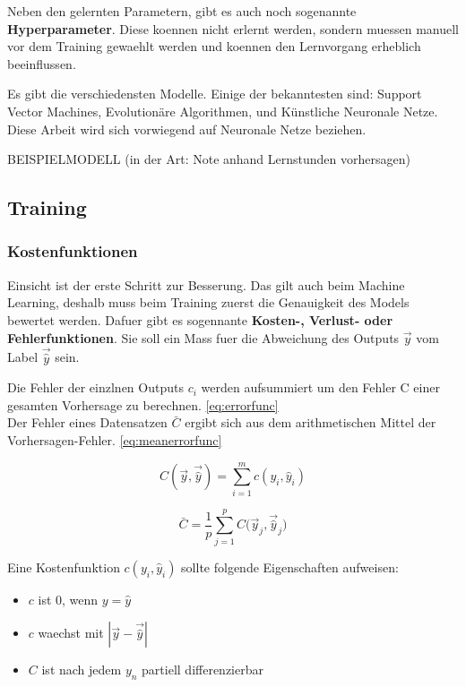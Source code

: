\documentclass[../main]{subfiles}
\begin{document}
Neben den gelernten Parametern, gibt es auch noch sogenannte \textbf{Hyperparameter}.
Diese koennen nicht erlernt werden, sondern muessen manuell vor dem Training gewaehlt werden und koennen den Lernvorgang erheblich beeinflussen.
\par
\medskip
Es gibt die verschiedensten Modelle. Einige der bekanntesten sind: Support Vector Machines, Evolutionäre Algorithmen, und Künstliche Neuronale Netze.
Diese Arbeit wird sich vorwiegend auf Neuronale Netze beziehen.

BEISPIELMODELL (in der Art: Note anhand Lernstunden vorhersagen)

\subsection{Training}
\subsubsection{Kostenfunktionen}
Einsicht ist der erste Schritt zur Besserung. Das gilt auch beim Machine Learning, deshalb muss beim Training zuerst die Genauigkeit des Models bewertet werden.
Dafuer gibt es sogennante \textbf{Kosten-, Verlust- oder Fehlerfunktionen}. Sie soll ein Mass fuer die Abweichung des Outputs $\vec{y}$ vom Label $\vec{\hat{y}}$ sein.
\par\medskip
Die Fehler der einzlnen Outputs $c_i$ werden aufsummiert um den Fehler C einer gesamten Vorhersage zu berechnen. \ref{eq:errorfunc}\\
Der Fehler eines Datensatzen $\bar{C}$ ergibt sich aus dem arithmetischen Mittel der Vorhersagen-Fehler. \ref{eq:meanerrorfunc}\\
%
\begin{minipage}[t]{0.5\textwidth}
    \centering
    \begin{equation}\label{eq:errorfunc}
        C(\vec{y},\vec{\hat{y}})=\displaystyle\sum_{i=1}^{m} c(y_i, \hat{y}_i)
    \end{equation}
\end{minipage}
\begin{minipage}[t]{0.5\textwidth}
    \centering
    \begin{equation}\label{eq:meanerrorfunc}
        \bar{C} = \frac{1}{p}\displaystyle\sum_{j=1}^{p} C\Big(\vec{y}_j,\vec{\hat{y}}_j\Big)
    \end{equation}
\end{minipage}

%
Eine Kostenfunktion $c(y_i,\hat{y}_i)$ sollte folgende Eigenschaften aufweisen:
\begin{itemize}
    \item{$c$ ist $0$, wenn $y = \hat{y}$}
    \item{$c$ waechst mit $|\vec{y}-\vec{\hat{y}}|$}
    \item{$C$ ist nach jedem $y_n$ partiell differenzierbar}
\end{itemize}
\end{document}

